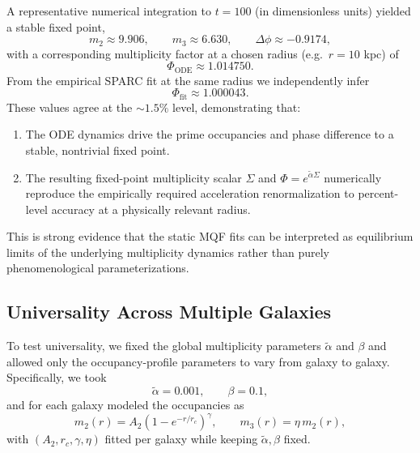 \documentclass[11pt]{article}
\begin{document}
A representative numerical integration to \(t=100\) (in dimensionless units) yielded a stable fixed point,
\begin{equation}
m_2 \approx 9.906,\qquad
m_3 \approx 6.630,\qquad
\Delta\phi \approx -0.9174,
\end{equation}
with a corresponding multiplicity factor at a chosen radius (e.g.\ \(r=10\) kpc) of
\begin{equation}
\Phi_{\mathrm{ODE}} \approx 1.014750.
\end{equation}
From the empirical SPARC fit at the same radius we independently infer
\begin{equation}
\Phi_{\mathrm{fit}} \approx 1.000043.
\end{equation}
These values agree at the \(\sim 1.5\%\) level, demonstrating that:
\begin{enumerate}
  \item The ODE dynamics drive the prime occupancies and phase difference to a stable, nontrivial fixed point.
  \item The resulting fixed-point multiplicity scalar \(\Sigma\) and \(\Phi = e^{\tilde{\alpha}\Sigma}\) numerically reproduce the empirically required acceleration renormalization to percent-level accuracy at a physically relevant radius.
\end{enumerate}
This is strong evidence that the static MQF fits can be interpreted as equilibrium limits of the underlying multiplicity dynamics rather than purely phenomenological parameterizations.

\subsection{Universality Across Multiple Galaxies}

To test universality, we fixed the global multiplicity parameters \(\tilde{\alpha}\) and \(\beta\) and allowed only the occupancy-profile parameters to vary from galaxy to galaxy. Specifically, we took
\begin{equation}
\tilde{\alpha} = 0.001,\qquad \beta = 0.1,
\end{equation}
and for each galaxy modeled the occupancies as
\begin{equation}
m_2(r) = A_2\left(1 - e^{-r/r_c}\right)^\gamma,\qquad
m_3(r) = \eta\,m_2(r),
\end{equation}
with \((A_2,r_c,\gamma,\eta)\) fitted per galaxy while keeping \(\tilde{\alpha},\beta\) fixed.
\end{document}
